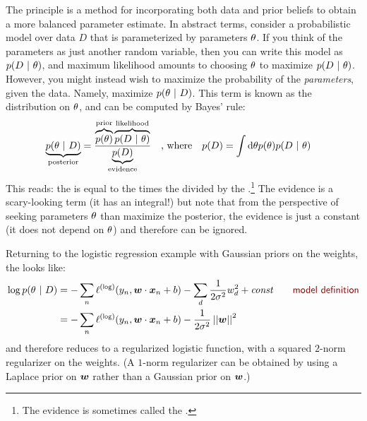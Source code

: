 The  principle is a method for
incorporating both data and prior beliefs to obtain a more balanced
parameter estimate.  In abstract terms, consider a probabilistic model
over data $D$ that is parameterized by parameters $\theta$.  If you think
of the parameters as just another random variable, then you can write
this model as $p(D \textrm{~}\arrowvert\textrm{~} \theta)$, and maximum likelihood amounts to
choosing $\theta$ to maximize $p(D \textrm{~}\arrowvert\textrm{~} \theta)$.  However, you might instead
wish to maximize the probability of the \emph{parameters}, given the
data.  Namely, maximize $p(\theta \textrm{~}\arrowvert\textrm{~} D)$.  This term is known as the
 distribution on $\theta$, and can be computed by
Bayes' rule:
%
\begin{align}
  \underbrace{p(\theta \textrm{~}\arrowvert\textrm{~} D)}_{\text{posterior}}
  &= \frac {
       \overbrace{p(\theta)}^{\text{prior}}
       \overbrace{p(D \textrm{~}\arrowvert\textrm{~} \theta)}^{\text{likelihood}}
     } {
       \underbrace{p(D)}_{\text{evidence}}
     }
 \quad\text{, where}\quad
 p(D) = \int \textrm{d}\theta p(\theta) p(D \textrm{~}\arrowvert\textrm{~} \theta)
\end{align}
%
This reads: the  is equal to the 
times the  divided by the
.\footnote{The evidence is sometimes called the
  .}  The evidence is a scary-looking
term (it has an integral!) but note that from the perspective of
seeking parameters $\theta$ than maximize the posterior, the evidence is
just a constant (it does not depend on $\theta$) and therefore can be
ignored.

Returning to the logistic regression example with Gaussian priors on
the weights, the  looks like:
%
\begin{align}
   \log p(\th \| D)
&= - \sum_n \ell\xth{log}(y_n, \dotp{\vw}{\vx_n} + b)
   - \sum_d \frac 1 {2 \si^2} w_d^2
   + \textit{const}
   \becauseof{model definition}\\
&= - \sum_n \ell\xth{log}(y_n, \dotp{\vw}{\vx_n} + b)
   - \frac 1 {2 \si^2} \norm{\vw}^2
\end{align}
%
and therefore reduces to a regularized logistic function, with a
squared $2$-norm regularizer on the weights.  (A $1$-norm regularizer
can be obtained by using a Laplace prior on ${\boldsymbol{w}}$ rather than a
Gaussian prior on ${\boldsymbol{w}}$.)



